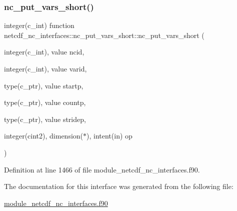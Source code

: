 \subsubsection{\texorpdfstring{nc\+\_\+put\+\_\+vars\+\_\+short()}{nc\_put\_vars\_short()}}
{\footnotesize\ttfamily integer(c\+\_\+int) function netcdf\+\_\+nc\+\_\+interfaces\+::nc\+\_\+put\+\_\+vars\+\_\+short\+::nc\+\_\+put\+\_\+vars\+\_\+short (\begin{DoxyParamCaption}\item[{integer(c\+\_\+int), value}]{ncid,  }\item[{integer(c\+\_\+int), value}]{varid,  }\item[{type(c\+\_\+ptr), value}]{startp,  }\item[{type(c\+\_\+ptr), value}]{countp,  }\item[{type(c\+\_\+ptr), value}]{stridep,  }\item[{integer(cint2), dimension($\ast$), intent(in)}]{op }\end{DoxyParamCaption})}



Definition at line 1466 of file module\+\_\+netcdf\+\_\+nc\+\_\+interfaces.\+f90.



The documentation for this interface was generated from the following file\+:\begin{DoxyCompactItemize}
\item 
\hyperlink{module__netcdf__nc__interfaces_8f90}{module\+\_\+netcdf\+\_\+nc\+\_\+interfaces.\+f90}\end{DoxyCompactItemize}
